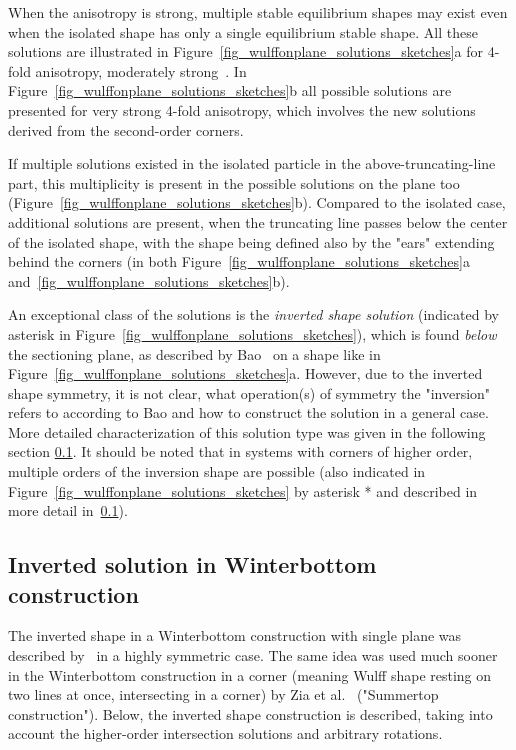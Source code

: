 	When the anisotropy is strong, multiple stable equilibrium shapes may exist even when the isolated shape has only a single equilibrium stable shape. All these solutions are illustrated in Figure~\ref{fig_wulffonplane_solutions_sketches}a for 4-fold anisotropy, moderately strong~\cite{Bao2017}. In  Figure~\ref{fig_wulffonplane_solutions_sketches}b all possible solutions are presented for very strong 4-fold anisotropy, which involves the new solutions derived from the second-order corners.
	
	If multiple solutions existed in the isolated particle in the above-truncating-line part, this multiplicity is present in the possible solutions on the plane too (Figure~\ref{fig_wulffonplane_solutions_sketches}b). Compared to the isolated case, additional solutions are present, when the truncating line passes below the center of the isolated shape, with the shape being defined also by the "ears" extending behind the corners (in both Figure~\ref{fig_wulffonplane_solutions_sketches}a and~\ref{fig_wulffonplane_solutions_sketches}b).
	
	An exceptional class of the solutions is the \textit{inverted shape solution} (indicated by asterisk in Figure~\ref{fig_wulffonplane_solutions_sketches}), which is found \textit{below} the sectioning plane, as described by Bao~\cite{Bao2017} on a shape like in Figure~\ref{fig_wulffonplane_solutions_sketches}a. However, due to the inverted shape symmetry, it is not clear, what operation(s) of symmetry the "inversion" refers to according to Bao and how to construct the solution in a general case. More detailed characterization of this solution type was given in the following section \ref{sec_inverted_Winterbottom}. It should be noted that in systems with corners of higher order, multiple orders of the inversion shape are possible (also indicated in Figure~\ref{fig_wulffonplane_solutions_sketches} by asterisk * and described in more detail in~\ref{sec_inverted_Winterbottom}).
	
	\subsection{Inverted solution in Winterbottom construction} \label{sec_inverted_Winterbottom}
	The inverted shape in a Winterbottom construction with single plane was described by~\cite{Bao2017} in a highly symmetric case. The same idea was used much sooner in the Winterbottom construction in a corner (meaning Wulff shape resting on two lines at once, intersecting in a corner) by Zia et al.~\cite{Zia1988} ("Summertop construction"). Below, the inverted shape construction is described, taking into account the higher-order intersection solutions and arbitrary rotations.
	
